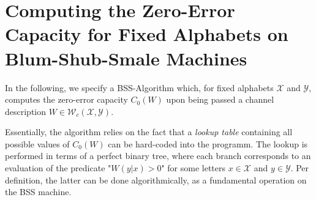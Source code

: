 \documentclass[conference]{IEEEtran}
\def\X{{\mathcal X}}
\def\Y{{\mathcal Y}}
\def\W{{\mathcal W}}
\begin{document}
\section{Computing the Zero-Error Capacity for Fixed Alphabets on Blum-Shub-Smale Machines}	\label{sec:ComputingZeroErrorOnBSS}
	\noindent In the following, we specify a BSS-Algorithm which, for fixed alphabets \(\X\) and \(\Y\), computes the zero-error capacity \(C_0(W)\) 
	upon being passed a channel description \(W \in \W_c(\X,\Y)\). 

	Essentially, the algorithm relies on the fact that a \emph{lookup table} containing all possible values of \(C_0(W)\) can be hard-coded into the programm. The lookup is performed in 
	terms of a perfect binary tree, where each branch corresponds to an evaluation of the predicate "\(W(y|x) > 0\)" for some letters \(x\in\X\) and \(y\in\Y\). Per definition, the latter 
	can be done algorithmically, as a fundamental operation on the BSS machine.
\end{document}
